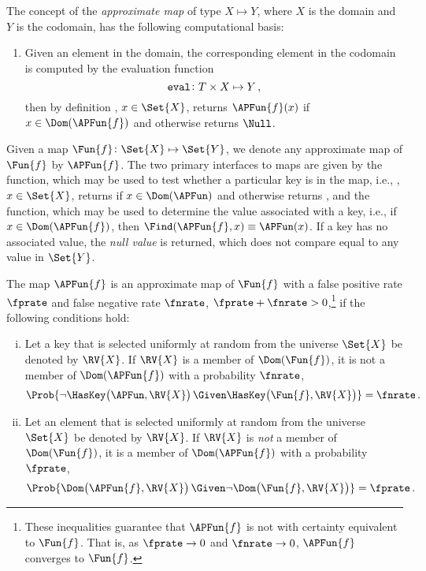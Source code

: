 \documentclass[ ../main.tex]{subfiles}
\begin{document}
\begin{definition}
	\label{def:approx_map}
	The concept of the \emph{approximate map} of type $X \mapsto Y$, where $X$ is the domain and $Y$ is the codomain, has the following computational basis:
	\begin{enumerate}
		\item Given an element in the domain, the corresponding element in the codomain is computed by the evaluation function
		\begin{equation}
		\FuncSty{eval} \colon T \times X \mapsto Y\,,
		\end{equation}
		then by definition , $x \in \Set{X}$, returns $\APFun{f}(x)$ if $x \in \Dom(\APFun{f})$ and otherwise returns $\Null$.
	\end{enumerate}
	
	Given a map $\Fun{f} \colon \Set{X} \mapsto \Set{Y}$, we denote any approximate map of $\Fun{f}$ by $\APFun{f}$. The two primary interfaces to maps are given by the \HasKey function, which may be used to test whether a particular key is in the map, i.e., , $x \in \Set{X}$, returns \True if $x \in \Dom(\APFun)$ and otherwise returns \False, and the \Find function, which may be used to determine the value associated with a key, i.e., if $x \in \Dom(\APFun{f})$, then $\Find(\APFun{f},x) \equiv \APFun(x)$. If a key has no associated value, the \emph{null value} is returned, which does not compare equal to any value in $\Set{Y}$.
	
	The map $\APFun{f}$ is an approximate map of $\Fun{f}$ with a false positive rate $\fprate$ and false negative rate $\fnrate$, $\fprate + \fnrate > 0$,\footnote{These inequalities guarantee that $\APFun{f}$ is not with certainty equivalent to $\Fun{f}$.
		That is, as $\fprate \to 0$ and $\fnrate \to 0$, $\APFun{f}$ converges to $\Fun{f}$.} if the following conditions hold:
	\begin{enumerate}[(i)]
		\item Let a key that is selected uniformly at random from the universe $\Set{X}$ be denoted by $\RV{X}$. If $\RV{X}$ is a member of $\Dom(\Fun{f})$, it is not a member of $\Dom(\APFun{f})$ with a probability $\fnrate$,
		\begin{equation}
		\Prob{\neg \HasKey\!\left(\APFun,\RV{X}\right) \Given \HasKey\!\left(\Fun{f},\RV{X}\right)} = \fnrate\,.
		\end{equation}
		
		\item Let an element that is selected uniformly at random from the universe $\Set{X}$ be denoted by $\RV{X}$. If $\RV{X}$ is \emph{not} a member of $\Dom(\Fun{f})$, it is a member of $\Dom(\APFun{f})$ with a probability $\fprate$,
		\begin{equation}
		\Prob{\Dom\!\left(\APFun{f},\RV{X}\right) \Given \neg \Dom\!\left(\Fun{f},\RV{X}\right)} = \fprate\,.
		\end{equation}
	\end{enumerate}
\end{definition}
\end{document}
